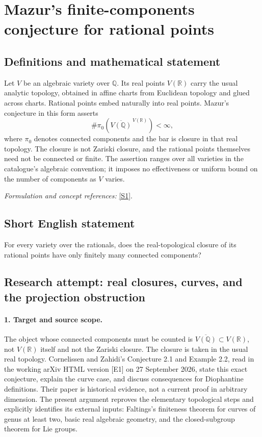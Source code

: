 \documentclass[11pt]{article}
\begin{document}
\section*{\texorpdfstring{Mazur's finite-components conjecture for rational points}{Mazur's finite-components conjecture for rational points}}\label{11300003}
\subsection{Definitions and mathematical statement}
Let $V$ be an algebraic variety over ${\mathbb{Q}}$. Its real points $V({\mathbb{R}})$ carry the usual analytic topology, obtained in affine charts from Euclidean topology and glued across charts. Rational points embed naturally into real points. Mazur's conjecture in this form asserts
\[
 \#\pi_0\!\left(\overline{V({\mathbb{Q}})}^{\,V({\mathbb{R}})}\right)<\infty,
\]
where $\pi_0$ denotes connected components and the bar is closure in that real topology. The closure is not Zariski closure, and the rational points themselves need not be connected or finite. The assertion ranges over all varieties in the catalogue's algebraic convention; it imposes no effectiveness or uniform bound on the number of components as $V$ varies.
\par\smallskip\textit{Formulation and concept references:} \href{https://ar5iv.labs.arxiv.org/html/math/0006140}{[S1]}.

\subsection{Short English statement}
For every variety over the rationals, does the real-topological closure of its rational points have only finitely many connected components?
\subsection{Research attempt: real closures, curves, and the projection obstruction}
\paragraph{1. Target and source scope.}
The object whose connected components must be counted is $\overline{V(\mathbb Q)}\subset V(\mathbb R)$, not $V(\mathbb R)$ itself and not the Zariski closure. The closure is taken in the usual real topology. Cornelissen and Zahidi's Conjecture 2.1 and Example 2.2, read in the working arXiv HTML version [E1] on 27 September 2026, state this exact conjecture, explain the curve case, and discuss consequences for Diophantine definitions. Their paper is historical evidence, not a current proof in arbitrary dimension. The present argument reproves the elementary topological steps and explicitly identifies its external inputs: Faltings's finiteness theorem for curves of genus at least two, basic real algebraic geometry, and the closed-subgroup theorem for Lie groups.
\end{document}
